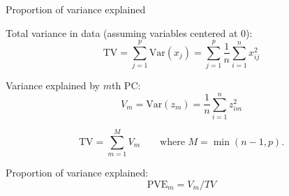 \documentclass[14pt]{beamer}
\begin{document}
\begin{frame}{\large Proportion of variance explained}\fontsize{13}{14}\sf

\alert{Total variance} in data (assuming variables centered at 0):
\[
\text{TV} = \sum_{j=1}^p \text{Var}(x_j) = \sum_{j=1}^p \frac{1}{n}\sum_{i=1}^n x_{ij}^2
\]

\alert{Variance explained} by $m$th PC:
$$V_m = \text{Var}(z_m) = \frac{1}{n}\sum_{i=1}^n z_{im}^2$$

$$\text{TV} = \sum_{m=1}^M V_m\qquad \text{where $M=\min(n-1,p)$.}$$

\begin{block}{Proportion of variance explained:}
$$\text{PVE}_m = V_m / TV$$
\end{block}
\end{frame}
\end{document}
